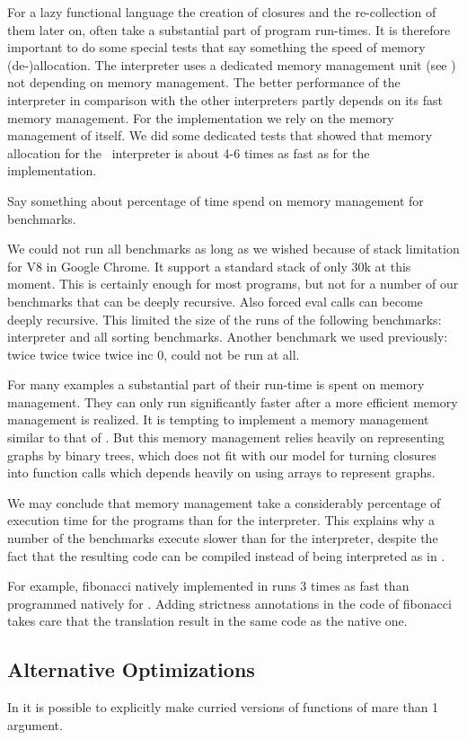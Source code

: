 For a lazy functional language the creation of closures and the re-collection of them later on, often take a substantial part of program run-times.
It is therefore important to do some special tests that say something the speed of memory (de-)allocation.
The \Sapl interpreter uses a dedicated memory management unit (see \cite{JKP}) not depending on \Java memory management. 
The better performance of the \Sapl interpreter in comparison with the other interpreters partly depends on its fast memory management.
For the \JS implementation we rely on  the memory management of \JS itself.
We did some dedicated tests that showed that memory allocation for the \Java\ \Sapl interpreter is about 4-6 times as fast as for the \JS implementation.

Say something about percentage of time spend on memory management for benchmarks.

We could not run all benchmarks as long as we wished because of stack limitation for V8 \JS in Google Chrome. 
It support a standard stack of only 30k at this moment.
This is certainly enough for most \JS programs, but not for a number of our benchmarks that can be deeply recursive. 
Also forced \textsf{eval} calls can become deeply recursive. 
This limited the size of the runs of the following benchmarks: interpreter and all sorting benchmarks. 
Another benchmark we used previously: \textsf{twice twice twice twice inc 0}, could not be run at all.

For many \Sapljs examples a substantial part of their run-time is spent on memory management. 
They can only run significantly faster after a more efficient memory management is realized.
It is tempting to implement a memory management similar to that of \Sapl. 
But this memory management relies heavily on representing graphs by binary trees, 
which does not fit with our model for turning closures into \JS function calls which depends heavily on using arrays to
represent graphs.

We may conclude that memory management take a considerably percentage of execution time for the \Sapljs programs than for
the \Sapl interpreter. This explains why a number of the benchmarks execute slower than for the \Sapl interpreter, despite the fact
that the resulting code can be compiled instead of being interpreted as in \Sapl.

For example, \textsf{fibonacci} natively implemented in \Java runs 3 times as fast than programmed natively for \JS.
Adding strictness annotations in the \Sapl code of \textsf{fibonacci} takes care that the \JS translation result in the same code 
as the native one. 

\subsection{Alternative Optimizations}
In \JS it is possible to explicitly make curried versions of functions of mare than 1 argument.

